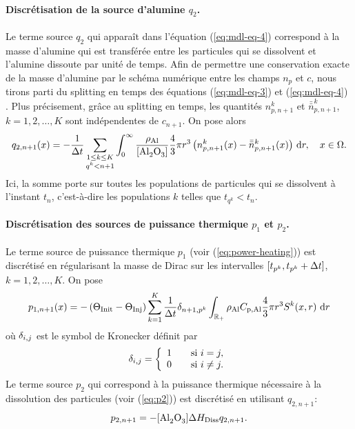 \paragraph{Discrétisation de la source d'alumine $q_{2}$.}
Le terme source $q_{2}$ qui apparaît dans l'équation
(\ref{eq:mdl-eq-4}) correspond à la masse d'alumine qui est transférée
entre les particules qui se dissolvent et l'alumine dissoute par unité
de temps. Afin de permettre une conservation exacte de la masse d'alumine
par le schéma numérique entre les champs $n_p$ et $c$, nous
tirons parti du splitting en temps des équations (\ref{eq:mdl-eq-3})
et (\ref{eq:mdl-eq-4}) \cite{Hofer2011}. Plus précisement, grâce au
splitting en temps, les quantités $n_{p,n+1}^k$ et $\bar{\bar n}_{p,n+1}^k$, $k = 1, 2, \dots, K$
sont indépendentes de $c_{n+1}$. On pose alors
\begin{equation}\label{eq:q2}
  q_{2,n+1}(x) = -\frac{1}{\dt} \sum_{\substack{1\leq k\leq K\\ q^k < n+1}}
  \int_{0}^\infty
  \frac{\aluminadensity}{[\ce{Al2O3}]} \frac{4}{3}\pi r^3
  \parent{n_{p,n+1}^k(x) - \bar{\bar n}_{p,n+1}^k(x)} \intd{r}, \quad x\in\Omega.
\end{equation}
Ici, la somme porte sur toutes les populations de particules qui se
dissolvent à l'instant $t_n$, c'est-à-dire les populations $k$
telles que $t_{q^k} < t_n$.


\paragraph{Discrétisation des sources de puissance thermique $p_1$ et
$p_2$.} Le terme source de puissance thermique $p_1$ (voir (\ref{eq:power-heating})) est discrétisé
en régularisant la masse de Dirac sur les intervalles $[t_{p^k},
  t_{p^k} + \Delta t]$, $k = 1, 2, \dots, K$. On pose
\begin{equation}\label{eq:p1-discret}
p_{1,n+1}(x) = -\left( \Theta_\text{Init} - \Theta_\text{Inj} \right)\sum_{k = 1}^K
\frac{1}{\Delta t}\delta_{n+1,p^k}\int_{\mathbb R_+} \rho_\mathrm{Al}C_{\mathrm{p,Al}}
\frac{4}{3}\pi r^3S^k(x, r)\,\,\mathrm dr
\end{equation}
où $\delta_{i,j}$ est le symbol de Kronecker définit par
\begin{equation}
  \delta_{i,j} = \left\{
  \begin{array}{ll}
    1&\quad\text{si } i = j,\\
    0&\quad\text{si } i\neq j.
  \end{array}\right.
\end{equation}
Le terme source $p_2$ qui correspond à la puissance thermique
nécessaire à la dissolution des particules (voir (\ref{eq:p2})) est
discrétisé en utilisant $q_{2,n+1}$:
\begin{equation}\label{eq:p2-discret}
p_{2,n+1} = -[\cee{Al2O3}]\aluminadissolutionenthalpy q_{2,n+1}.
\end{equation}

